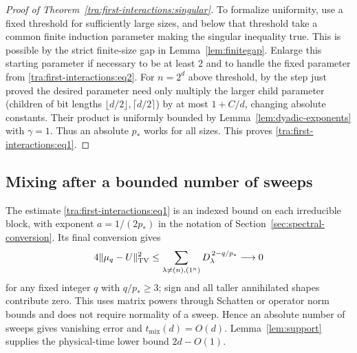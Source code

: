 \begin{proof}[Proof of Theorem~\ref{tra:first-interactions:singular}]
\label{tra:first-interactions:bounded-induction-parameter}
To formalize uniformity, use a fixed threshold for sufficiently large sizes, and below that threshold take a common finite induction parameter making the singular inequality true. This is possible by the strict finite-size gap in Lemma~\ref{lem:finitegap}. Enlarge this starting parameter if necessary to be at least 2 and to handle the fixed parameter from \eqref{tra:first-interactions:eq2}. For \(n=2^d\) above threshold, by the step just proved the desired parameter need only multiply the larger child parameter (children of bit lengths \(\lfloor d/2\rfloor,\lceil d/2\rceil\)) by at most \(1+C/d\), changing absolute constants. Their product is uniformly bounded by Lemma~\ref{lem:dyadic-exponents} with $\gamma=1$. Thus an absolute \(p_*\) works for all sizes. This proves \eqref{tra:first-interactions:eq1}.

\end{proof}

\subsection{Mixing after a bounded number of sweeps}

\label{tra:first-interactions:fourier-summation-and-time-normalization}
The estimate \eqref{tra:first-interactions:eq1} is an indexed
bound on each irreducible block, with exponent $a=1/(2p_*)$ in
the notation of Section~\ref{sec:spectral-conversion}. Its final
conversion gives
\[
 4\|\mu_q-U\|_{\mathrm{TV}}^2
 \le\sum_{\lambda\ne(n),(1^n)}D_\lambda^{\,2-q/p_*}
 \longrightarrow0
\]
for any fixed integer $q$ with $q/p_*\ge3$; sign and all taller
annihilated shapes contribute zero. This uses matrix powers through
Schatten or operator norm bounds and does not require normality of a
sweep. Hence an absolute number of sweeps gives vanishing error and
$t_{\mathrm{mix}}(d)=O(d)$. Lemma~\ref{lem:support} supplies the
physical-time lower bound $2d-O(1)$.
